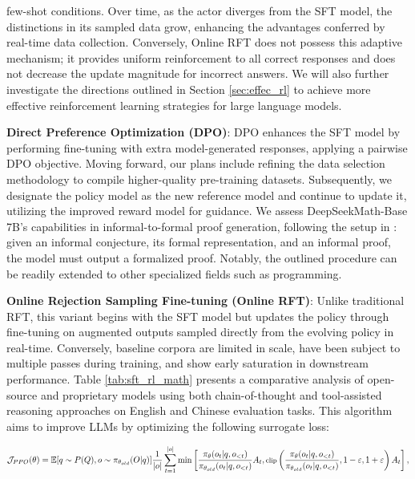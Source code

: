few-shot conditions. Over time, as the actor diverges from the SFT model, the distinctions in its sampled data grow, enhancing the advantages conferred by real-time data collection. Conversely, Online RFT does not possess this adaptive mechanism; it provides uniform reinforcement to all correct responses and does not decrease the update magnitude for incorrect answers. We will also further investigate the directions outlined in Section \ref{sec:effec_rl} to achieve more effective reinforcement learning strategies for large language models. \item \textbf{Direct Preference Optimization (DPO)}: DPO enhances the SFT model by performing fine-tuning with extra model-generated responses, applying a pairwise DPO objective. Moving forward, our plans include refining the data selection methodology to compile higher-quality pre-training datasets. Subsequently, we designate the policy model as the new reference model and continue to update it, utilizing the improved reward model for guidance. We assess DeepSeekMath-Base 7B’s capabilities in informal-to-formal proof generation, following the setup in \citep{dsp_proof}: given an informal conjecture, its formal representation, and an informal proof, the model must output a formalized proof. Notably, the outlined procedure can be readily extended to other specialized fields such as programming. \item \textbf{Online Rejection Sampling Fine-tuning (Online RFT)}: Unlike traditional RFT, this variant begins with the SFT model but updates the policy through fine-tuning on augmented outputs sampled directly from the evolving policy in real-time. Conversely, baseline corpora are limited in scale, have been subject to multiple passes during training, and show early saturation in downstream performance. Table \ref{tab:sft_rl_math} presents a comparative analysis of open-source and proprietary models using both chain-of-thought and tool-assisted reasoning approaches on English and Chinese evaluation tasks. This algorithm aims to improve LLMs by optimizing the following surrogate loss:

\begin{equation}
\footnotesize
            \mathcal{J}_{PPO}(\theta) = \mathbb{E}{[q \sim P(Q), o \sim \pi_{\theta_{old}}(O|q)]} \frac{1}{|o|} \sum_{t=1}^{|o|} \min \left[ \frac{\pi_\theta(o_{t} | q, o_{<t})}{\pi_{\theta_{old}}(o_{t} | q, o_{<t})} A_{t}, \text{clip} \left( \frac{\pi_\theta(o_{t} | q, o_{<t})}{\pi_{\theta_{old}}(o_{t} | q, o_{<t})}, 1 - \varepsilon, 1 + \varepsilon \right)  A_{t} \right] ,
\end{equation}

